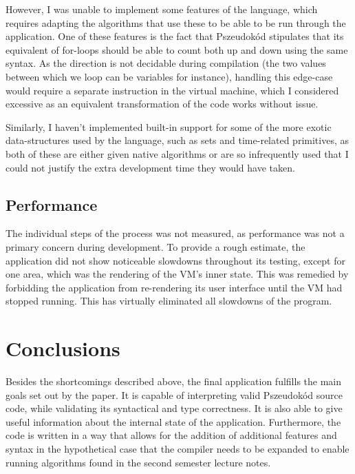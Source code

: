 \documentclass[conference]{IEEEtran}
\begin{document}
However, I was unable to implement some features of the language, which requires adapting the algorithms that use these to be able to be run through the application. One of these features is the fact that Pszeudokód stipulates that its equivalent of for-loops should be able to count both up and down using the same syntax. As the direction is not decidable during compilation (the two values between which we loop can be variables for instance), handling this edge-case would require a separate instruction in the virtual machine, which I considered excessive as an equivalent transformation of the code works without issue.

Similarly, I haven't implemented built-in support for some of the more exotic data-structures used by the language, such as sets and time-related primitives, as both of these are either given native algorithms or are so infrequently used that I could not justify the extra development time they would have taken.

\subsection{Performance}

The individual steps of the process was not measured, as performance was not a primary concern during development. To provide a rough estimate, the application did not show noticeable slowdowns throughout its testing, except for one area, which was the rendering of the VM's inner state. This was remedied by forbidding the application from re-rendering its user interface until the VM had stopped running. This has virtually eliminated all slowdowns of the program.

\section{Conclusions}

Besides the shortcomings described above, the final application fulfills the main goals set out by the paper. It is capable of interpreting valid Pszeudokód source code, while validating its syntactical and type correctness. It is also able to give useful information about the internal state of the application. Furthermore, the code is written in a way that allows for the addition of additional features and syntax in the hypothetical case that the compiler needs to be expanded to enable running algorithms found in the second semester lecture notes.
\end{document}
